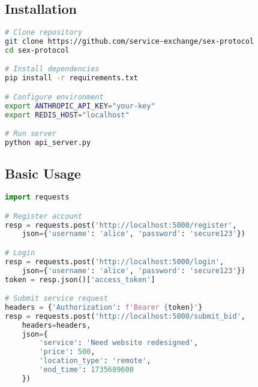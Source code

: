 \documentclass[11pt,a4paper]{article}
\begin{document}
\subsection{Installation}

\begin{lstlisting}[language=bash]
# Clone repository
git clone https://github.com/service-exchange/sex-protocol
cd sex-protocol

# Install dependencies
pip install -r requirements.txt

# Configure environment
export ANTHROPIC_API_KEY="your-key"
export REDIS_HOST="localhost"

# Run server
python api_server.py
\end{lstlisting}

\subsection{Basic Usage}

\begin{lstlisting}[language=Python]
import requests

# Register account
resp = requests.post('http://localhost:5000/register', 
    json={'username': 'alice', 'password': 'secure123'})

# Login
resp = requests.post('http://localhost:5000/login',
    json={'username': 'alice', 'password': 'secure123'})
token = resp.json()['access_token']

# Submit service request
headers = {'Authorization': f'Bearer {token}'}
resp = requests.post('http://localhost:5000/submit_bid',
    headers=headers,
    json={
        'service': 'Need website redesigned',
        'price': 500,
        'location_type': 'remote',
        'end_time': 1735689600
    })
\end{lstlisting}
\end{document}
